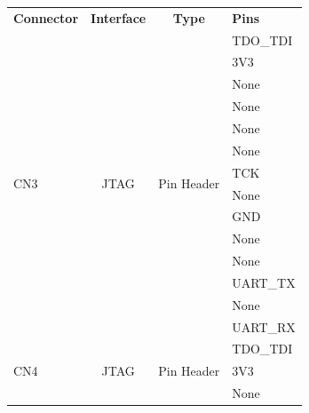 \begin{table}[!htb]
    \centering
    \label{tab:icd}
    \begin{tabular}{lccl}
        \toprule[1.5pt]
        \textbf{Connector} & \textbf{Interface} & \textbf{Type} & \textbf{Pins} \\
        \multirow{14}{*}{CN3} & \multirow{14}{*}{JTAG} & \multirow{14}{*}{Pin Header} & TDO\_TDI \\
                              &                        &                              & 3V3 \\
                              &                        &                              & None \\
                              &                        &                              & None \\
                              &                        &                              & None \\
                              &                        &                              & None \\
                              &                        &                              & TCK \\
                              &                        &                              & None \\
                              &                        &                              & GND \\
                              &                        &                              & None \\
                              &                        &                              & None \\
                              &                        &                              & UART\_TX \\
                              &                        &                              & None \\
                              &                        &                              & UART\_RX \\
        \midrule
        \multirow{14}{*}{CN4} & \multirow{14}{*}{JTAG} & \multirow{14}{*}{Pin Header} & TDO\_TDI \\
                              &                        &                              & 3V3 \\
                              &                        &                              & None \\

\end{tabular}
\end{table}
